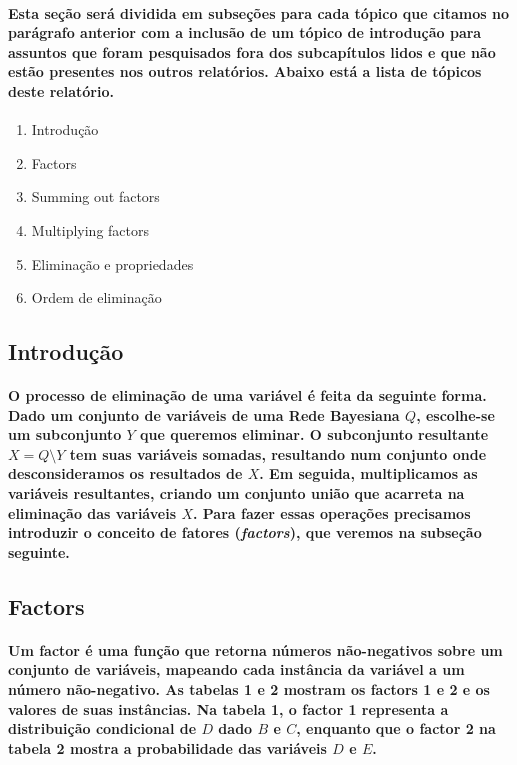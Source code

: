 \documentclass[a4paper,10pt]{article}
\theoremstyle{plain}
\begin{document}
\paragraph{
  Esta seção será dividida em subseções para cada tópico que citamos no parágrafo anterior com a
inclusão de um tópico de introdução para assuntos que foram pesquisados fora dos subcapítulos lidos
e que não estão presentes nos outros relatórios. Abaixo está a lista de tópicos deste relatório.
}
\begin{enumerate}
  \item Introdução
  \item Factors
  \item Summing out factors
  \item Multiplying factors
  \item Eliminação e propriedades
  \item Ordem de eliminação
\end{enumerate}

\subsection{Introdução}

\paragraph{
  O processo de eliminação de uma variável é feita da seguinte forma. Dado um conjunto de variáveis
de uma Rede Bayesiana $Q$, escolhe-se um subconjunto $Y$ que queremos eliminar. O subconjunto 
resultante $X = Q \setminus Y$ tem suas variáveis somadas, resultando num conjunto onde 
desconsideramos os
resultados de $X$. Em seguida, multiplicamos as variáveis resultantes, criando um conjunto união 
que acarreta na eliminação das variáveis $X$. Para fazer essas operações precisamos introduzir o
conceito de fatores (\textit{factors}), que veremos na subseção seguinte.
}

\subsection{Factors}

\paragraph{
  Um factor é uma função que retorna números não-negativos sobre um conjunto de variáveis, mapeando 
cada instância da variável a um número não-negativo. As tabelas 1 e 2 mostram os factors 1 e 2 e 
os valores de suas instâncias. Na tabela 1, o factor 1 representa a distribuição condicional de
$D$ dado $B$ e $C$, enquanto que o factor 2 na tabela 2 mostra a probabilidade das variáveis $D$ e
$E$.
}
\end{document}
